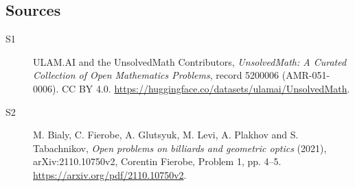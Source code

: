 \documentclass[11pt]{article}
\begin{document}
\subsection{Sources}
\begin{description}
\item[\hypertarget{source:5200006:1}{S1}] ULAM.AI and the UnsolvedMath Contributors, \emph{UnsolvedMath: A Curated Collection of Open Mathematics Problems}, record 5200006 (AMR-051-0006). CC BY 4.0. \url{https://huggingface.co/datasets/ulamai/UnsolvedMath}.
\item[\hypertarget{source:5200006:2}{S2}] M. Bialy, C. Fierobe, A. Glutsyuk, M. Levi, A. Plakhov and S. Tabachnikov, \emph{Open problems on billiards and geometric optics} (2021), arXiv:2110.10750v2, Corentin Fierobe, Problem 1, pp. 4--5. \url{https://arxiv.org/pdf/2110.10750v2}.
\end{description}
\label{end:5200006}
\end{document}
